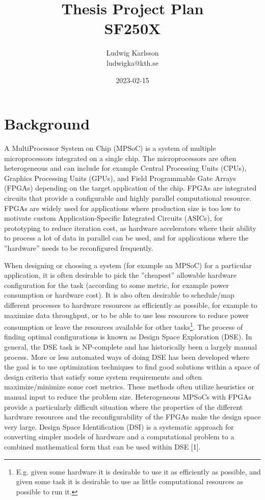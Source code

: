 \documentclass[12pt,notitlepage]{article}
\title{Thesis Project Plan\\SF250X}
\author{Ludwig Karlsson\\ludwigka@kth.se}
\date{2023-02-15}
\begin{document}
\maketitle

\section{Background}
A MultiProcessor System on Chip (MPSoC) is a system of multiple microprocessors integrated on a single chip. The microprocessors are often heterogeneous and can include for example Central Processing Units (CPUs), Graphics Processing Units (GPUs), and Field Programmable Gate Arrays (FPGAs) depending on the target application of the chip. FPGAs are integrated circuits that provide a configurable and highly parallel computational resource. FPGAs are widely used for applications where production size is too low to motivate custom Application-Specific Integrated Circuits (ASICs), for prototyping to reduce iteration cost, as hardware accelerators where their ability to process a lot of data in parallel can be used, and for applications where the ''hardware'' needs to be reconfigured frequently.

When designing or choosing a system (for example an MPSoC) for a particular application, it is often desirable to pick the ''cheapest'' allowable hardware configuration for the task (according to some metric, for example power consumption or hardware cost). It is also often desirable to schedule/map different processes to hardware resources as efficiently as possible, for example to maximize data throughput, or to be able to use less resources to reduce power consumption or leave the resources available for other tasks\footnote{E.g. given some hardware it is desirable to use it as efficiently as possible, and given some task it is desirable to use as little computational resources as possible to run it.}. The process of finding optimal configurations is known as Design Space Exploration (DSE). In general, the DSE task is NP-complete and has historically been a largely manual process. More or less automated ways of doing DSE has been developed where the goal is to use optimization techniques to find good solutions within a space of design criteria that satisfy some system requirements and often maximize/minimize some cost metrics. These methods often utilize heuristics or manual input to reduce the problem size. Heterogeneous MPSoCs with FPGAs provide a particularly difficult situation where the properties of the different hardware resources and the reconfigurability of the FPGAs make the design space very large. Design Space Identification (DSI) is a systematic approach for converting simpler models of hardware and a computational problem to a combined mathematical form that can be used within DSE [1].
\end{document}

